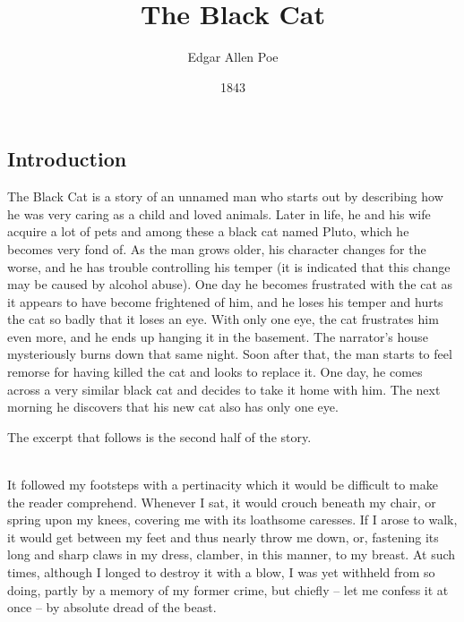 \documentclass[11pt,a4paper]{article}
\begin{document}
\title{The Black Cat}
\date{1843}
\author{Edgar Allen Poe}
\subsection{Introduction}
The Black Cat is a story of an unnamed man who starts out by describing how he was very caring as a child and loved animals. Later in life, he and his wife acquire a lot of pets and among these a black cat named Pluto, which he becomes very fond of. As the man grows older, his character changes for the worse, and he has trouble controlling his temper (it is indicated that this change may be caused by alcohol abuse). One day he becomes frustrated with the cat as it appears to have become frightened of him, and he loses his temper and hurts the cat so badly that it loses an eye. With only one eye, the cat frustrates him even more, and he ends up hanging it in the basement. The narrator’s house mysteriously burns down that same night. Soon after that, the man starts to feel remorse for having killed the cat and looks to replace it. One day, he comes across a very similar black cat and decides to take it home with him. The next morning he discovers that his new cat also has only one eye. 

The excerpt that follows is the second half of the story.
\maketitle
    
\thispagestyle{plain}
\setcounter{page}{1}
\linenumbers
\noindent […]\\[5pt]

\noindent It followed my footsteps with a pertinacity which it would be difficult to make the reader comprehend. Whenever I sat, it would crouch beneath my chair, or spring upon my knees, covering me with its loathsome caresses. If I arose to walk, it would get between my feet and thus nearly throw me down, or, fastening its long and sharp claws in my dress, clamber, in this manner, to my breast. At such times, although I longed to destroy it with a blow, I was yet withheld from so doing, partly by a memory of my former crime, but chiefly -- let me confess it at once -- by absolute dread of the beast.
\end{document}
